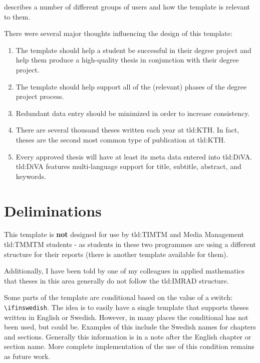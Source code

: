  describes a number of different groups of users and how the template is relevant to them.

There were several major thoughts influencing the design of this template:
\begin{enumerate}[leftmargin=*, label=\textbf{Thought \arabic*}, ref={Thought \arabic*}]
    \item \label{thought:helpStudent} The template should help a student be successful in their degree project and help them produce a high-quality thesis in conjunction with their degree project.
    
    \item \label{thought:process} The template should help support all of the (relevant) phases of the degree project process.
    
    \item \label{thought:reducingDataEntry} Redundant data entry should be minimized in order to increase consistency.
    
    \item \label{thought:volume} There are several thousand theses written each year at \gls{tld:KTH}. In fact, theses are the second most common type of publication at \gls{tld:KTH}.
    
    \item \label{thought:inDiVA} Every approved thesis will have at least its meta data entered into \gls{tld:DiVA}. \gls{tld:DiVA} features multi-language support for title, subtitle, abstract, and keywords.
\end{enumerate}

\section{Deliminations}

This template is \textbf{not} designed for use by \gls{tld:TIMTM} and Media Management \gls{tld:TMMTM} students - as students in these two programmes are using a different structure for their reports (there is another template available for them).

Additionally, I have been told by one of my colleagues in applied mathematics that theses in this area generally do not follow the \gls{tld:IMRAD} structure.

Some parts of the template are conditional based on the value of a switch: \texttt{\textbackslash ifinswedish}. The idea is to easily have a single template that supports theses written in English or Swedish. However, in many places the conditional has not been used, but could be. Examples of this include the Swedish names for chapters and sections. Generally this information is in a note after the English chapter or section name. More complete implementation of the use of this condition remains as future work.

